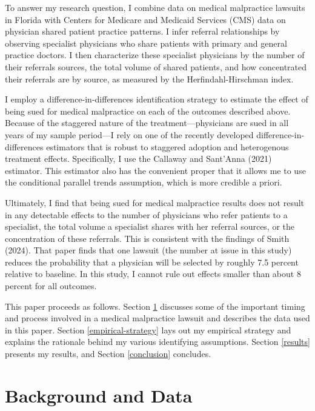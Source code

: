\documentclass[
  12pt,
]{article}
\begin{document}
To answer my research question, I combine data on medical malpractice lawsuits in Florida with Centers for Medicare and Medicaid Services (CMS) data on physician shared patient practice patterns. I infer referral relationships by observing specialist physicians who share patients with primary and general practice doctors. I then characterize these specialist physicians by the number of their referrals sources, the total volume of shared patients, and how concentrated their referrals are by source, as measured by the Herfindahl-Hirschman index.

I employ a difference-in-differences identification strategy to estimate the effect of being sued for medical malpractice on each of the outcomes described above. Because of the staggered nature of the treatment---physicians are sued in all years of my sample period---I rely on one of the recently developed difference-in-differences estimators that is robust to staggered adoption and heterogenous treatment effects. Specifically, I use the Callaway and Sant'Anna (2021) estimator. This estimator also has the convenient proper that it allows me to use the conditional parallel trends assumption, which is more credible a priori.

Ultimately, I find that being sued for medical malpractice results does not result in any detectable effects to the number of physicians who refer patients to a specialist, the total volume a specialist shares with her referral sources, or the concentration of these referrals. This is consistent with the findings of Smith (2024). That paper finds that one lawsuit (the number at issue in this study) reduces the probability that a physician will be selected by roughly 7.5 percent relative to baseline. In this study, I cannot rule out effects smaller than about 8 percent for all outcomes.

This paper proceeds as follows. Section \ref{background-and-data} discusses some of the important timing and process involved in a medical malpractice lawsuit and describes the data used in this paper. Section \ref{empirical-strategy} lays out my empirical strategy and explains the rationale behind my various identifying assumptions. Section \ref{results} presents my results, and Section \ref{conclusion} concludes.

\hypertarget{background-and-data}{%
\section{Background and Data}\label{background-and-data}}
\end{document}
